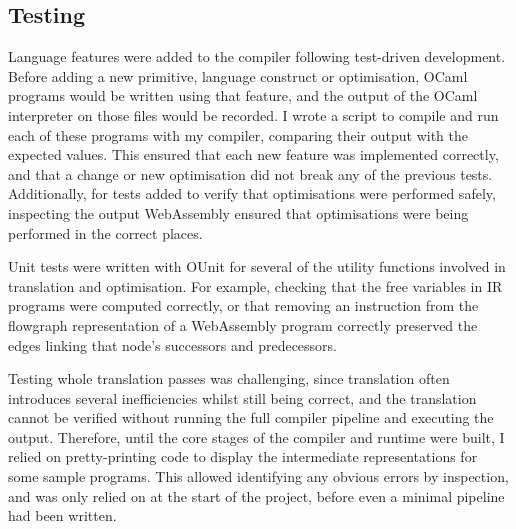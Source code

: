 \subsection{Testing}
Language features were added to the compiler following test-driven development. Before adding a new primitive, language construct or optimisation, OCaml programs would be written using that feature, and the output of the OCaml interpreter on those files would be recorded. 
I wrote a script to compile and run each of these programs with my compiler, comparing their output with the expected values. This ensured that each new feature was implemented correctly, and that a change or new optimisation did not break any of the previous tests. %
Additionally, for tests added to verify that optimisations were performed safely, inspecting the output WebAssembly ensured that optimisations were being performed in the correct places. 



Unit tests were written with OUnit \cite{ounit} for several of the utility functions involved in translation and optimisation. For example, checking that the free variables in IR programs  were computed correctly, or that removing an instruction from the flowgraph representation of a WebAssembly program correctly preserved the edges linking that node's successors and predecessors.


Testing whole translation passes was challenging, since translation often introduces several inefficiencies whilst still being correct, and the translation cannot be verified without running the full compiler pipeline and executing the output. Therefore, until the core stages of the compiler and runtime were built, I relied on pretty-printing code to display the intermediate representations for some sample programs. This allowed identifying any obvious errors by inspection, and was only relied on at the start of the project, before even a minimal pipeline had been written.


